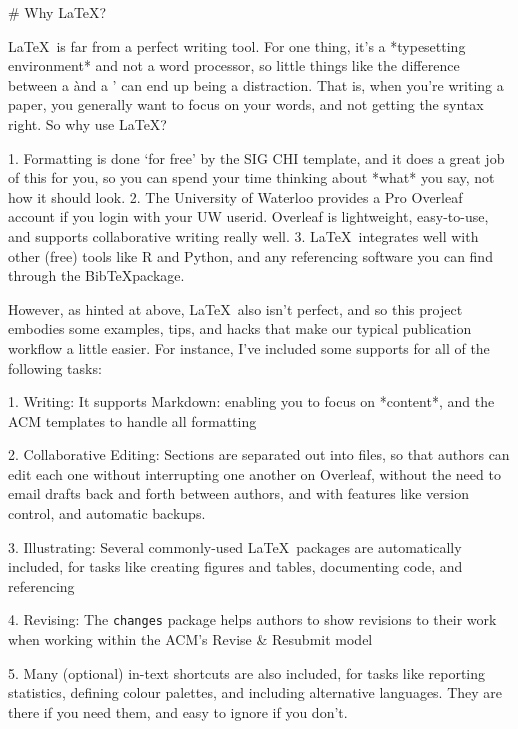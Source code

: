 %
%


\newpage
\begin{markdown}

# Why \LaTeX?

\LaTeX\ is far from a perfect writing tool. For one thing, it's a *typesetting environment* and not a word processor, so little things like the difference between a \` and a ' can end up being a distraction. That is, when you're writing a paper, you generally want to focus on your words, and not getting the syntax right. So why use \LaTeX?

1. Formatting is done `for free' by the SIG CHI template, and it does a great job of this for you, so you can spend your time thinking about *what* you say, not how it should look.
2. The University of Waterloo provides a Pro Overleaf account if you login with your UW userid. Overleaf is lightweight, easy-to-use, and supports collaborative writing really well. 
3. \LaTeX\ integrates well with other (free) tools like R and Python, and any referencing software you can find through the Bib\TeX package.

However, as hinted at above, \LaTeX\ also isn't perfect, and so this project embodies some examples, tips, and hacks that make our typical publication workflow a little easier. For instance, I've included some supports for all of the following tasks:

1. Writing: It supports Markdown: enabling you to focus on *content*, and the ACM templates to handle all formatting

2. Collaborative Editing: Sections are separated out into files, so that authors can edit each one without interrupting one another on Overleaf, without the need to email drafts back and forth between authors, and with features like version control, and automatic backups. 

3. Illustrating: Several commonly-used \LaTeX\ packages are automatically included, for tasks like creating figures and tables, documenting code, and referencing

4. Revising: The \texttt{changes} package helps authors to show revisions to their work when working within the ACM's Revise \& Resubmit model

5. Many (optional) in-text shortcuts are also included, for tasks like reporting statistics, defining colour palettes, and including alternative languages. They are there if you need them, and easy to ignore if you don't. 




\end{markdown}
